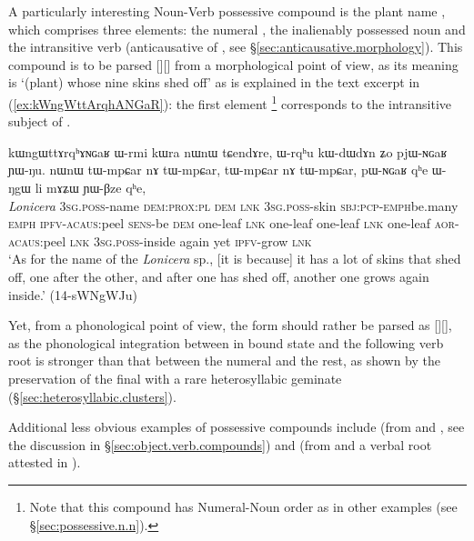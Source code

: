A particularly interesting Noun-Verb possessive compound is the plant name , which comprises three elements: the numeral , the inalienably possessed noun  and the intransitive verb  (anticausative of , see §\ref{sec:anticausative.morphology}). This compound is to be parsed [][] from a morphological point of view, as its meaning is `(plant) whose nine skins shed off' as is explained in the text excerpt in (\ref{ex:kWngWttArqhANGaR}): the first element \footnote{Note that this compound has Numeral-Noun order as in other examples (see §\ref{sec:possessive.n.n}).} corresponds to the intransitive subject of . 

\begin{exe}
\ex \label{ex:kWngWttArqhANGaR}
\gll kɯngɯttɤrqʰɤɴɢaʁ ɯ-rmi kɯra nɯnɯ tɕendɤre, ɯ-rqʰu kɯ-dɯ\redp{}dɤn ʑo pjɯ-ɴɢaʁ ɲɯ-ŋu. nɯnɯ tɯ-mpɕar nɤ tɯ-mpɕar, tɯ-mpɕar nɤ tɯ-mpɕar, pɯ-ɴɢaʁ qʰe ɯ-ŋgɯ li mɤʑɯ ɲɯ-βze qʰe, \\
\textit{Lonicera} \textsc{3sg}.\textsc{poss}-name \textsc{dem}:\textsc{prox:pl} \textsc{dem} \textsc{lnk} \textsc{3sg}.\textsc{poss}-skin \textsc{sbj}:\textsc{pcp}-\textsc{emph}\redp{}be.many \textsc{emph} \textsc{ipfv}-\textsc{acaus}:peel \textsc{sens}-be \textsc{dem} one-leaf \textsc{lnk} one-leaf one-leaf \textsc{lnk} one-leaf \textsc{aor}-\textsc{acaus}:peel \textsc{lnk} \textsc{3sg}.\textsc{poss}-inside again yet \textsc{ipfv}-grow \textsc{lnk} \\
\glt `As for the name of the \textit{Lonicera} sp., [it is because] it has a lot of skins that shed off, one after the other, and after one has shed off, another one grows again inside.' (14-sWNgWJu) 
\end{exe}

Yet, from a phonological point of view, the form should rather be parsed as [][], as the phonological integration between  in bound state and the following verb root is stronger than that between the numeral  and the rest, as shown by the preservation of the final  with a rare heterosyllabic geminate (§\ref{sec:heterosyllabic.clusters}).

Additional less obvious examples of possessive compounds include  (from  and , see the discussion in §\ref{sec:object.verb.compounds}) and  (from  and a verbal root  attested in ). 

